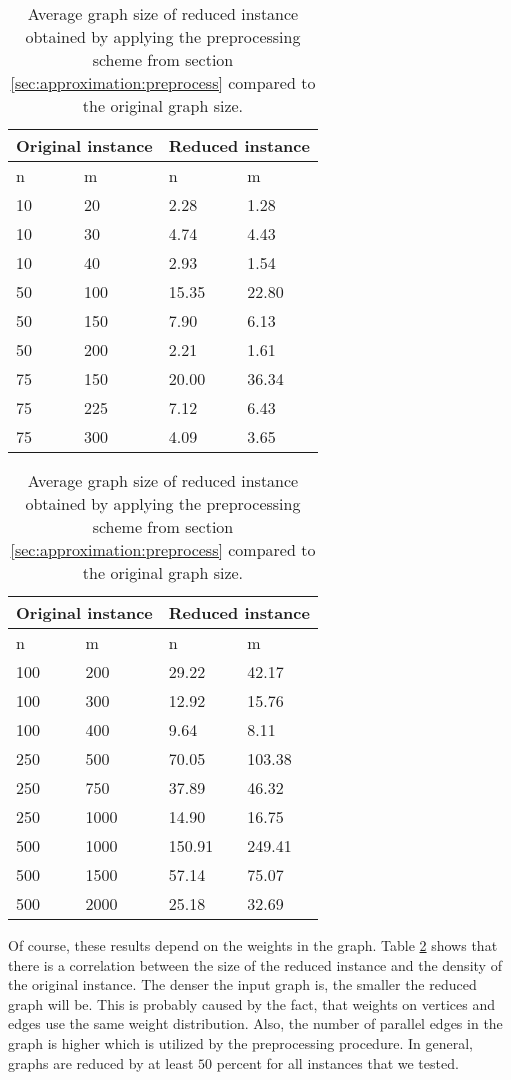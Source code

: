 \begin{table}[H]
	\centering
	\small
	\begin{minipage}{.5\linewidth}
		\centering
		\begin{tabular}{|l|l|l|l|}
			\hline
			\multicolumn{2}{|c|}{Original instance}&\multicolumn{2}{c|}{Reduced instance}\\ \hline
			n& m& n& m\\ \hline
			10&20&2.28&1.28\\ \hline
			10&30&4.74&4.43\\ \hline
			10&40&2.93&1.54\\ \hline
			50&100&15.35&22.80\\ \hline
			50&150&7.90&6.13\\ \hline
			50&200&2.21&1.61\\ \hline
			75&150&20.00&36.34\\ \hline
			75&225&7.12&6.43\\ \hline
			75&300&4.09&3.65\\ \hline
		\end{tabular}
	\end{minipage}%
	\begin{minipage}{.5\linewidth}
		\centering
		\begin{tabular}{|l|l|l|l|}
			\hline
			\multicolumn{2}{|c|}{Original instance}&\multicolumn{2}{c|}{Reduced instance}\\ \hline
			n& m& n& m\\ \hline
			100&200&29.22&42.17\\ \hline
			100&300&12.92&15.76\\ \hline
			100&400&9.64&8.11\\ \hline
			250&500&70.05&103.38\\ \hline
			250&750&37.89&46.32\\ \hline
			250&1000&14.90&16.75\\ \hline
			500&1000&150.91&249.41\\ \hline
			500&1500&57.14&75.07\\ \hline
			500&2000&25.18&32.69\\ \hline
		\end{tabular}
	\end{minipage} 
	\caption{Average graph size of reduced instance obtained by applying the preprocessing scheme from section \ref{sec:approximation:preprocess} compared to the original graph size.}
	\label{table:preprocesssize}
\end{table}

Of course, these results depend on the weights in the graph. Table \ref{table:preprocesssize} shows that there is a correlation between the size of the reduced instance and the density of the original instance. The denser the input graph is, the smaller the reduced graph will be. This is probably caused by the fact, that weights on vertices and edges use the same weight distribution. Also, the number of parallel edges in the graph is higher which is utilized by the preprocessing procedure. In general, graphs are reduced by at least $50$ percent for all instances that we tested.\medskip

